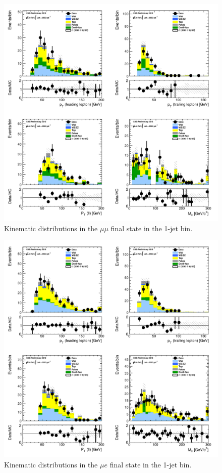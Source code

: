 \begin{figure}[!hbtp]
\centering
\includegraphics[width=1\textwidth]{figures/ww_analysis20_0_ALL_mm_1j.pdf} %
\caption{Kinematic distributions in the $\mu\mu$ final state in the 1-jet bin.}
\label{fig:xs_kinematics_mm_1j}
\end{figure}
\begin{figure}[!hbtp]
\centering
\includegraphics[width=1\textwidth]{figures/ww_analysis20_0_ALL_me_1j.pdf} %
\caption{Kinematic distributions in the $\mu e$ final state in the 1-jet bin.}
\label{fig:xs_kinematics_me_1j}
\end{figure}
